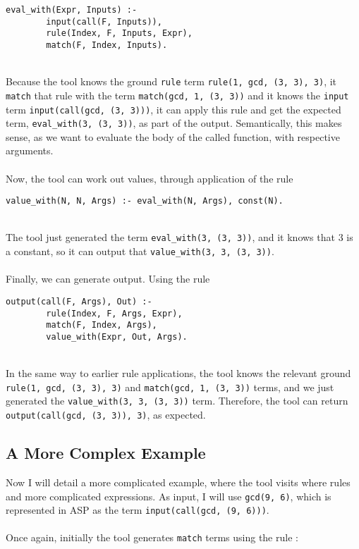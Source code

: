 \begin{lstlisting}[firstnumber=128]
eval_with(Expr, Inputs) :- 
		input(call(F, Inputs)), 
		rule(Index, F, Inputs, Expr), 
		match(F, Index, Inputs).
\end{lstlisting}
\mbox{} \\
Because the tool knows the ground \lstinline{rule} term \lstinline{rule(1, gcd, (3, 3), 3)}, it \lstinline{match} that rule with the term \lstinline{match(gcd, 1, (3, 3))} and it knows the \lstinline{input} term \lstinline{input(call(gcd, (3, 3)))}, it can apply this rule and get the expected term, \lstinline{eval_with(3, (3, 3))}, as part of the output. Semantically, this makes sense, as we want to evaluate the body of the called function, with respective arguments. \\ \\%
Now, the tool can work out values, through application of the rule \\

\begin{lstlisting}[firstnumber=97]
value_with(N, N, Args) :- eval_with(N, Args), const(N).
\end{lstlisting}
\mbox{} \\
The tool just generated the term \lstinline{eval_with(3, (3, 3))}, and it knows that 3 is a constant, so it can output that \lstinline{value_with(3, 3, (3, 3))}. \\ \\
Finally, we can generate output. Using the rule \\

\begin{lstlisting}[firstnumber=55]
output(call(F, Args), Out) :- 
		rule(Index, F, Args, Expr), 
		match(F, Index, Args), 
		value_with(Expr, Out, Args).
\end{lstlisting}
\mbox{} \\
In the same way to earlier rule applications, the tool knows the relevant ground \lstinline{rule(1, gcd, (3, 3), 3)} and \lstinline{match(gcd, 1, (3, 3))} terms, and we just generated the \lstinline{value_with(3, 3, (3, 3))} term. Therefore, the tool can return \lstinline{output(call(gcd, (3, 3)), 3)}, as expected.

\subsection{A More Complex Example}
Now I will detail a more complicated example, where the tool visits where rules and more complicated expressions. As input, I will use \lstinline{gcd(9, 6)}, which is represented in ASP as the term \lstinline{input(call(gcd, (9, 6)))}. \\ \\
Once again, initially the tool generates \lstinline{match} terms using the rule : \\ %


